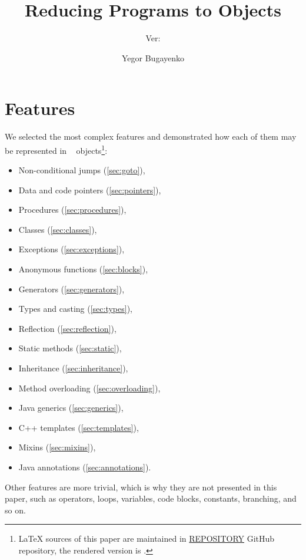 \documentclass[sigplan,nonacm]{acmart}
\title{Reducing Programs to Objects}
\subtitle{
  Ver:
  \texorpdfstring{
    \href{https://github.com/REPOSITORY/releases/tag/0.0.0}
      {\ff{0.0.0}}
  }{0.0.0}
}
\author{Yegor Bugayenko}
\affiliation{\institution{Huawei}\country{Russia}\city{Moscow}}
\begin{document}
\raggedbottom

\maketitle

\section{Features}

We selected the most complex features and demonstrated how each of them may be represented in \eolang{}~\citep{bugayenko2021eolang} objects\footnote{%
\LaTeX{} sources of this paper are maintained in
\href{https://github.com/REPOSITORY}{REPOSITORY} GitHub repository,
the rendered version is \href{https://github.com/REPOSITORY/releases/tag/0.0.0}{}.}:

\begin{itemize}
    \item Non-conditional jumps
      (\cref{sec:goto}),
    \item Data and code pointers
      (\cref{sec:pointers}),
    \item Procedures
      (\cref{sec:procedures}),
    \item Classes
        (\cref{sec:classes}),
    \item Exceptions
        (\cref{sec:exceptions}),
    \item Anonymous functions
        (\cref{sec:blocks}),
    \item Generators
        (\cref{sec:generators}),
    \item Types and casting
        (\cref{sec:types}),
    \item Reflection
        (\cref{sec:reflection}),
    \item Static methods
        (\cref{sec:static}),
    \item Inheritance
        (\cref{sec:inheritance}),
    \item Method overloading
        (\cref{sec:overloading}),
    \item Java generics
        (\cref{sec:generics}),
    \item C++ templates
        (\cref{sec:templates}),
    \item Mixins
        (\cref{sec:mixins}),
    \item Java annotations
        (\cref{sec:annotations}).
\end{itemize}

Other features are more trivial, which is why they are not presented in this paper, such as operators, loops, variables, code blocks, constants, branching, and so on.
\end{document}
